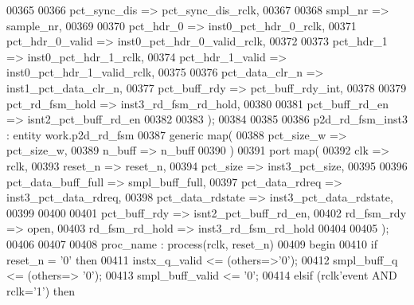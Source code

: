 \begin{DoxyCode}
00365       
00366       pct_sync_dis         => pct_sync_dis_rclk,
00367       
00368       smpl_nr              => sample_nr,
00369       
00370       pct_hdr_0            => inst0_pct_hdr_0_rclk,
00371       pct_hdr_0_valid      => inst0_pct_hdr_0_valid_rclk,
00372 
00373       pct_hdr_1            => inst0_pct_hdr_1_rclk,
00374       pct_hdr_1_valid      => inst0_pct_hdr_1_valid_rclk,
00375 
00376       pct_data_clr_n       => inst1_pct_data_clr_n,
00377       pct_buff_rdy         => pct_buff_rdy_int,
00378       
00379       pct_rd_fsm_hold      => inst3_rd_fsm_rd_hold,
00380 
00381       pct_buff_rd_en       => isnt2_pct_buff_rd_en
00382       
00383         \textcolor{vhdlchar}{)};
00384         
00385         
00386 p2d\_rd\_fsm\_inst3 : \textcolor{keywordflow}{entity} work.p2d_rd_fsm
00387    \textcolor{keywordflow}{generic} \textcolor{keywordflow}{map}(
00388       pct_size_w           => pct_size_w,
00389       n_buff               => n_buff
00390    \textcolor{vhdlchar}{)}
00391    \textcolor{keywordflow}{port} \textcolor{keywordflow}{map}(
00392       clk                  => rclk,
00393       reset_n              => reset_n,
00394       pct_size             => inst3_pct_size,
00395      
00396       pct_data_buff_full   => smpl_buff_full,
00397       pct_data_rdreq       => inst3_pct_data_rdreq,
00398       pct_data_rdstate     => inst3_pct_data_rdstate,
00399       
00400 
00401       pct_buff_rdy         => isnt2_pct_buff_rd_en,
00402       rd_fsm_rdy           => \textcolor{keywordflow}{open},
00403       rd_fsm_rd_hold       => inst3_rd_fsm_rd_hold
00404       
00405         \textcolor{vhdlchar}{)};
00406         
00407         
00408 proc\_name : \textcolor{keywordflow}{process}(rclk, reset_n)
00409 \textcolor{vhdlkeyword}{begin}
00410    \textcolor{keywordflow}{if} \textcolor{vhdlchar}{reset_n} \textcolor{vhdlchar}{=} \textcolor{vhdlchar}{'}\textcolor{vhdllogic}{}\textcolor{vhdllogic}{0}\textcolor{vhdlchar}{'} \textcolor{keywordflow}{then} 
00411       instx\_q\_valid <= (others=>'0');
00412       \textcolor{vhdlchar}{smpl_buff_q} \textcolor{vhdlchar}{<=} \textcolor{vhdlchar}{(}\textcolor{keywordflow}{others}\textcolor{vhdlchar}{=}\textcolor{vhdlchar}{>} \textcolor{vhdlchar}{'}\textcolor{vhdllogic}{}\textcolor{vhdllogic}{0}\textcolor{vhdlchar}{'}\textcolor{vhdlchar}{)};
00413       \textcolor{vhdlchar}{smpl_buff_valid} \textcolor{vhdlchar}{<=} \textcolor{vhdlchar}{'}\textcolor{vhdllogic}{}\textcolor{vhdllogic}{0}\textcolor{vhdlchar}{'};
00414    \textcolor{keywordflow}{elsif} \textcolor{vhdlchar}{(}\textcolor{vhdlchar}{rclk}\textcolor{vhdlchar}{'}\textcolor{vhdlkeyword}{event} \textcolor{keywordflow}{AND} \textcolor{vhdlchar}{rclk}\textcolor{vhdlchar}{=}\textcolor{vhdlchar}{'}\textcolor{vhdllogic}{}\textcolor{vhdllogic}{1}\textcolor{vhdlchar}{'}\textcolor{vhdlchar}{)} \textcolor{keywordflow}{then} 

\end{DoxyCode}
